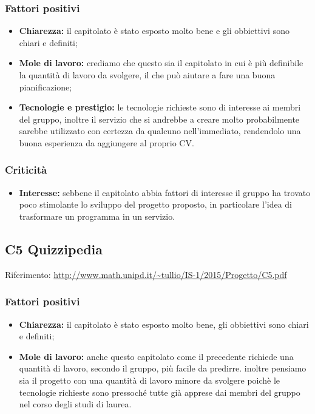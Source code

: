 \documentclass{scalatekids-article}
\begin{document}
\subsubsection{Fattori positivi}
\begin{itemize}
\item \textbf{Chiarezza:} il capitolato è stato esposto molto bene e gli obbiettivi sono chiari e definiti;
\item \textbf{Mole di lavoro:} crediamo che questo sia il capitolato in cui è più definibile la quantità di lavoro da svolgere, il che può aiutare a fare una buona pianificazione;
\item \textbf{Tecnologie e prestigio:} le tecnologie richieste sono di interesse ai membri del gruppo, inoltre il servizio che si andrebbe a creare molto probabilmente sarebbe utilizzato con certezza da qualcuno nell'immediato, rendendolo una buona esperienza da aggiungere al proprio CV.
\end{itemize}
\subsubsection{Criticità}
\begin{itemize}
\item \textbf{Interesse:} sebbene il capitolato abbia fattori di interesse il gruppo ha trovato poco stimolante lo sviluppo del progetto proposto, in particolare l'idea di trasformare un programma in un servizio.
\end{itemize}

\subsection{C5 Quizzipedia}
Riferimento: \url{http://www.math.unipd.it/~tullio/IS-1/2015/Progetto/C5.pdf}\\
\subsubsection{Fattori positivi}
\begin{itemize}
\item \textbf{Chiarezza:} il capitolato è stato esposto molto bene, gli obbiettivi sono chiari e definiti;
\item \textbf{Mole di lavoro:} anche questo capitolato come il precedente richiede una quantità di lavoro, secondo il gruppo, più facile da predirre. inoltre pensiamo sia il progetto con una quantità di lavoro minore da svolgere poichè le tecnologie richieste sono pressoché tutte già apprese dai membri del gruppo nel corso degli studi di laurea.
\end{itemize}
\end{document}

